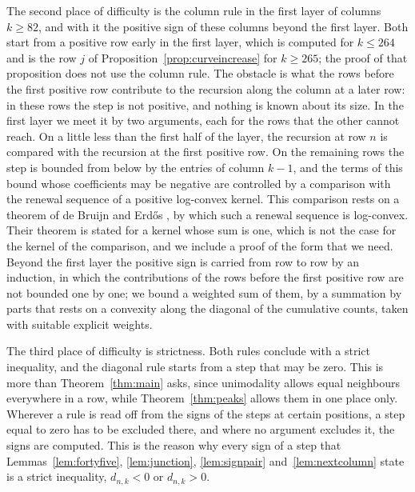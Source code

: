 \documentclass{amsart}
\theoremstyle{definition}
\theoremstyle{remark}
\numberwithin{equation}{section}
\begin{document}
The second place of difficulty is the column rule in the first layer of
columns $k\ge82$, and with it the positive sign of these columns beyond the
first layer. Both start from a positive row early in the first layer, which
is computed for $k\le264$ and is the row $j$ of
Proposition~\ref{prop:curveincrease} for $k\ge265$; the proof of that
proposition does not use the column rule. The obstacle is what the rows
before the first positive row contribute to the recursion along the column
at a later row: in these rows the step is not positive, and nothing is known
about its size. In the first layer we meet it by two arguments, each for the
rows that the other cannot reach. On a little less than the first half of
the layer, the recursion at row $n$ is compared with the recursion at the
first positive row. On the remaining rows
the step is bounded from below by the entries of column $k-1$, and the terms
of this bound whose coefficients may be negative are controlled by a
comparison with the renewal sequence of a positive log-convex kernel. This
comparison rests on a theorem of de Bruijn and Erd\H{o}s
\cite[Theorem~1]{debruijn1953}, by which such a renewal sequence is
log-convex. Their theorem is stated for a kernel whose sum is one, which is
not the case for the kernel of the comparison, and we include a proof of
the form that we need. Beyond the
first layer the positive sign is carried from row to row by an induction,
in which the contributions of the rows before the first positive row are
not bounded one by one; we bound a weighted sum of them, by a summation by
parts that rests on a convexity along the
diagonal of the cumulative counts, taken with suitable explicit weights.

The third place of difficulty is strictness. Both rules conclude with a
strict inequality, and the diagonal rule starts from a step that may be zero.
This is more than Theorem~\ref{thm:main} asks, since unimodality allows equal
neighbours everywhere in a row, while Theorem~\ref{thm:peaks} allows them in
one place only. Wherever a rule is read off from the signs of the steps at
certain positions, a step equal to zero has to be excluded there, and where
no argument excludes it, the signs are computed. This is the reason why
every sign of a step that Lemmas~\ref{lem:fortyfive}, \ref{lem:junction},
\ref{lem:signpair} and~\ref{lem:nextcolumn} state is a strict inequality,
$d_{n,k}<0$ or $d_{n,k}>0$.
\end{document}
